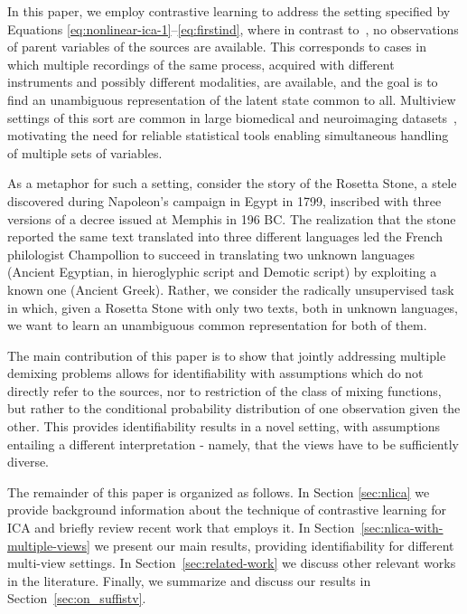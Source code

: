 \documentclass[letterpaper]{article}
\theoremstyle{definition}
\begin{document}
In this paper, we employ contrastive learning to address the setting specified by Equations \ref{eq:nonlinear-ica-1}--\ref{eq:firstind}, where in contrast to~\cite{hyvarinen19a}, no observations of parent variables of the sources are available. This corresponds to cases in which multiple recordings of the same process, acquired with different instruments and possibly different modalities, are available, and the goal is to find an unambiguous representation of the latent state common to all. Multiview settings of this sort are common in large biomedical and neuroimaging datasets~\cite{allen2012uk, miller2016multimodal, van2013wu, shafto2014cambridge}, motivating the need for reliable statistical tools enabling simultaneous handling of multiple sets of variables.


As a metaphor for such a setting, consider the story of the Rosetta Stone, a stele discovered during Napoleon's campaign in Egypt in 1799, inscribed with three versions of a decree issued at Memphis in 196 BC.
The realization that the stone reported the same text translated into three different languages led the French philologist Champollion to succeed in translating two unknown languages (Ancient Egyptian, in hieroglyphic script and Demotic script) by exploiting a known one (Ancient Greek).
Rather, we consider the radically unsupervised task in which, given a Rosetta Stone with only two texts, both in unknown languages, we want to learn an unambiguous common representation for both of them.









The main contribution of this paper is to show that jointly addressing multiple demixing problems allows for identifiability with assumptions which do not directly refer to the sources, nor to restriction of the class of mixing functions, but rather to the conditional probability distribution of one observation given the other.
This provides identifiability results in a novel setting, with assumptions entailing a different interpretation - namely, that the views have to be sufficiently diverse.




The remainder of this paper is organized as follows.
In Section \ref{sec:nlica} we provide background information about the technique of contrastive learning for ICA and briefly review recent work that employs it.
In Section~\ref{sec:nlica-with-multiple-views} we present our main results, providing identifiability for different multi-view settings.
In Section~\ref{sec:related-work} we discuss other relevant works in the literature.
Finally, we summarize and discuss our results in Section~\ref{sec:on_suffistv}.
\end{document}

